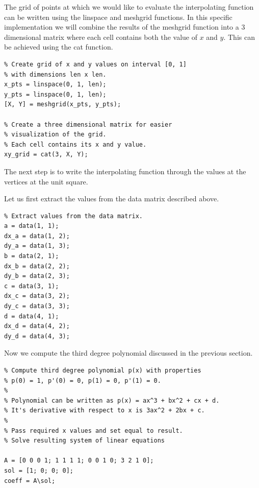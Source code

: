 \documentclass[fleqn]{article}
\begin{document}
The grid of points at which we would like to evaluate the interpolating function can be written using the linspace and meshgrid functions. In this specific implementation we will combine the results of the meshgrid function into a 3 dimensional matrix where each cell contains both the value of $x$ and $y$. This can be achieved using the cat function.

\begin{tcolorbox}
\begin{verbatim}
% Create grid of x and y values on interval [0, 1] 
% with dimensions len x len.
x_pts = linspace(0, 1, len);
y_pts = linspace(0, 1, len);
[X, Y] = meshgrid(x_pts, y_pts);
  
% Create a three dimensional matrix for easier 
% visualization of the grid.
% Each cell contains its x and y value.
xy_grid = cat(3, X, Y);
\end{verbatim}
\end{tcolorbox}

The next step is to write the interpolating function through the values at the vertices at the unit square. 

Let us first extract the values from the data matrix described above.

\begin{tcolorbox}
\begin{verbatim}
% Extract values from the data matrix.
a = data(1, 1);
dx_a = data(1, 2);
dy_a = data(1, 3);
b = data(2, 1);
dx_b = data(2, 2);
dy_b = data(2, 3);
c = data(3, 1);
dx_c = data(3, 2);
dy_c = data(3, 3);
d = data(4, 1);
dx_d = data(4, 2);
dy_d = data(4, 3);
\end{verbatim}
\end{tcolorbox}

Now we compute the third degree polynomial discussed in the previous section.

\begin{tcolorbox}
\begin{verbatim}
% Compute third degree polynomial p(x) with properties
% p(0) = 1, p'(0) = 0, p(1) = 0, p'(1) = 0.
%
% Polynomial can be written as p(x) = ax^3 + bx^2 + cx + d.
% It's derivative with respect to x is 3ax^2 + 2bx + c.
% 
% Pass required x values and set equal to result.
% Solve resulting system of linear equations

A = [0 0 0 1; 1 1 1 1; 0 0 1 0; 3 2 1 0];
sol = [1; 0; 0; 0];
coeff = A\sol;

\end{verbatim}
\end{tcolorbox}
\end{document}
